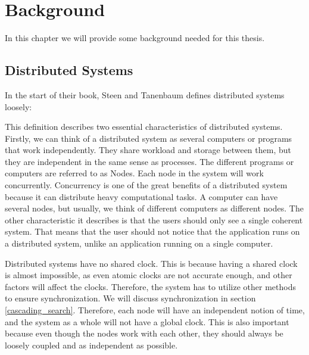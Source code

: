 \chapter{Background}

In this chapter we will provide some background needed for this thesis.

\section{Distributed Systems}\label{background:distributed_systems}
In the start of their book, Steen and Tanenbaum\cite{steen_distributed_2017} defines distributed systems loosely: 

This definition describes two essential characteristics of distributed systems. Firstly, we can think of a distributed system as several computers or programs that work independently. They share workload and storage between them, but they are independent in the same sense as processes. The different programs or computers are referred to as Nodes. Each node in the system will work concurrently. Concurrency is one of the great benefits of a distributed system because it can distribute heavy computational tasks. A computer can have several nodes, but usually, we think of different computers as different nodes. The other characteristic it describes is that the users should only see a single coherent system. That means that the user should not notice that the application runs on a distributed system, unlike an application running on a single computer.


Distributed systems have no shared clock. This is because having a shared clock is almost impossible, as even atomic clocks are not accurate enough, and other factors will affect the clocks. Therefore, the system has to utilize other methods to ensure synchronization. We will discuss synchronization in section \ref{cascading_search}. Therefore, each node will have an independent notion of time, and the system as a whole will not have a global clock\cite{steen_distributed_2017}. This is also important because even though the nodes work with each other, they should always be loosely coupled and as independent as possible.


